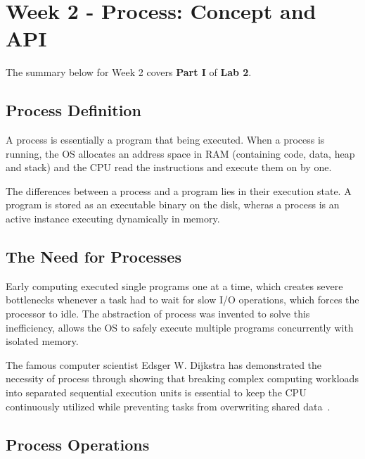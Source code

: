 \documentclass[11pt,a4paper]{article}
\begin{document}
\section{Week 2 - Process: Concept and API}

The summary below for Week 2 covers \textbf{Part I} of \textbf{Lab 2}.

\subsection{Process Definition}

A process is essentially a program that being executed. When a process is running, the OS allocates
an address space in RAM (containing code, data, heap and stack) and the CPU read the instructions
and execute them on by one.

\hspace{5pt}

\noindent The differences between a process and a program lies in their execution state.
A program is stored as an executable binary on the disk, wheras a process is an active instance executing dynamically in memory.

\subsection{The Need for Processes}

Early computing executed single programs one at a time, which creates severe bottlenecks whenever a task had to wait for slow I/O operations, which forces the processor to idle. The 
abstraction of process was invented to solve this inefficiency, allows the OS to safely execute multiple programs concurrently with isolated memory.

\hspace{5pt}

\noindent The famous computer scientist Edsger W. Dijkstra has demonstrated the necessity of process through 
showing that breaking complex computing workloads into separated sequential execution units is essential to keep the CPU
continuously utilized while preventing tasks from overwriting shared data~\cite{dijkstra1968the}.

\subsection{Process Operations}
\end{document}
